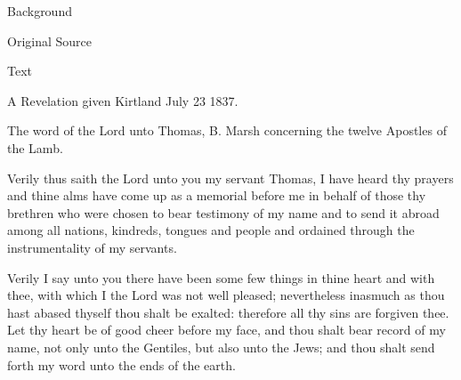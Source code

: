 				\begin{description}
					\item[Background]
				\end{description}
				
				
				\begin{description}
					\item[Original Source]
				\end{description}
				
				
				\begin{description}
					\item[Text]
				\end{description}
				
					\begin{tightcenter}
					A Revelation given Kirtland July 23 1837.
					\end{tightcenter}

					The word of the Lord unto Thomas, B. Marsh concerning the twelve Apostles of the Lamb.

					Verily thus saith the Lord unto you my servant Thomas, I have heard thy prayers and thine alms have come up as a memorial before me in behalf of those thy brethren who were chosen to bear testimony of my name and to send it abroad among all nations, kindreds, tongues and people and ordained through the instrumentality of my servants.

					Verily I say unto you there have been some few things in thine heart and with thee, with which I the Lord was not well pleased; nevertheless inasmuch as thou hast abased thyself thou shalt be exalted: therefore all thy sins are forgiven thee. Let thy heart be of good cheer before my face, and thou shalt bear record of my name, not only unto the Gentiles, but also unto the Jews; and thou shalt send forth my word unto the ends of the earth.

